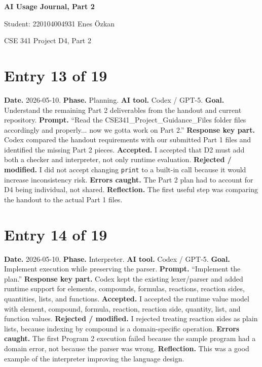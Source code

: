 \documentclass[11pt,a4paper]{article}
\newcommand{\code}[1]{\texttt{#1}}
\begin{document}
\begin{center}
{\huge\bfseries AI Usage Journal, Part 2\par}
{\large Student: 220104004931 Enes Özkan\par}
{\footnotesize\color{anscaption}CSE 341 Project D4, Part 2}
\end{center}

\section*{Entry 13 of 19}
\textbf{Date.} 2026-05-10.
\textbf{Phase.} Planning.
\textbf{AI tool.} Codex / GPT-5.
\textbf{Goal.} Understand the remaining Part 2 deliverables from the handout and current repository.
\textbf{Prompt.} ``Read the CSE341\_Project\_Guidance\_Files folder files accordingly and properly... now we gotta work on Part 2.''
\textbf{Response key part.} Codex compared the handout requirements with our submitted Part 1 files and identified the missing Part 2 pieces.
\textbf{Accepted.} I accepted that D2 must add both a checker and interpreter, not only runtime evaluation.
\textbf{Rejected / modified.} I did not accept changing \code{print} to a built-in call because it would increase inconsistency risk.
\textbf{Errors caught.} The Part 2 plan had to account for D4 being individual, not shared.
\textbf{Reflection.} The first useful step was comparing the handout to the actual Part 1 files.

\section*{Entry 14 of 19}
\textbf{Date.} 2026-05-10.
\textbf{Phase.} Interpreter.
\textbf{AI tool.} Codex / GPT-5.
\textbf{Goal.} Implement execution while preserving the parser.
\textbf{Prompt.} ``Implement the plan.''
\textbf{Response key part.} Codex kept the existing lexer/parser and added runtime support for elements, compounds, formulas, reactions, reaction sides, quantities, lists, and functions.
\textbf{Accepted.} I accepted the runtime value model with element, compound, formula, reaction, reaction side, quantity, list, and function values.
\textbf{Rejected / modified.} I rejected treating reaction sides as plain lists, because indexing by compound is a domain-specific operation.
\textbf{Errors caught.} The first Program 2 execution failed because the sample program had a domain error, not because the parser was wrong.
\textbf{Reflection.} This was a good example of the interpreter improving the language design.
\end{document}
